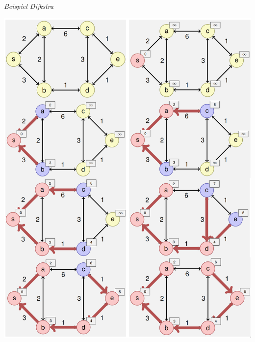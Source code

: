 \begin{sectionbox}
\textit{Beispiel Dijkstra}\par
\includegraphics[width = \columnwidth]{../img/DijkstraBsp.png}\par
\end{sectionbox}

